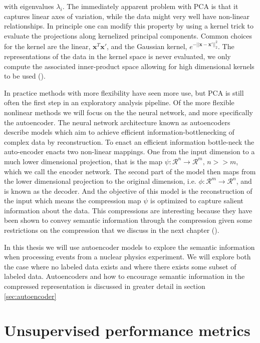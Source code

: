 \noindent with eigenvalues $\lambda_i$. The immediately apparent problem with PCA is that it captures linear axes of variation, while the data might very well have non-linear relationships. In principle one can modify this property by using a kernel trick to evaluate the projections along kernelized principal components. Common choices for the kernel are the linear, $\mathbf{x}^T\mathbf{x}'$, and the Gaussian kernel, $e^{-||\mathbf{x} - \mathbf{x}'||^2_2}$. The representations of the data in the kernel space is never evaluated, we only compute the associated inner-product space allowing for high dimensional kernels to be used (\cite{Scholkopf1996}). 

In practice methods with more flexibility have seen more use, but PCA is still often the first step in an exploratory analysis pipeline. Of the more flexible nonlinear methods we will focus on the the neural network, and more specifically the autoencoder. The neural network architecture known as autoencoders describe models which aim to achieve efficient information-bottlenecking of complex data by reconstruction. To enact an efficient information bottle-neck the auto-encoder enacts two non-linear mappings. One from the input dimension to a much lower dimensional projection, that is the map $\psi: \mathcal{R}^n \rightarrow \mathcal{R}^m,\, n >> m$, which we call the encoder network. The second part of the model then maps from the lower dimensional projection to the original dimension, i.e. $\phi: \mathcal{R}^m \rightarrow \mathcal{R}^n$, and is known as the decoder. And the objective of this model is the reconstruction of the input which means the compression map $\psi$ is optimized to capture salient information about the data. This compressions are interesting because they have been shown to convey semantic information through the compression given some restrictions on the compression that we discuss in the next chapter (\cite{Fertig}).

In this thesis we will use autoencoder models to explore the semantic information when processing events from a nuclear physics experiment. We will explore both the case where no labeled data exists and where there exists some subset of labeled data. Autoencoders and how to encourage semantic information in the compressed representation is discussed in greater detail in section \ref{sec:autoencoder}

\section{Unsupervised performance metrics}\label{sec:unsupervised_perf}

